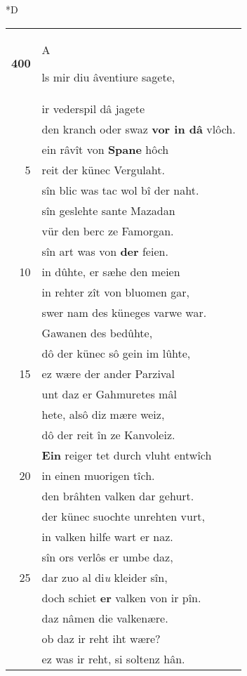 \documentclass[8pt,a4paper,notitlepage]{article}
\begin{document}
\begin{table}[ht]
\begin{minipage}[t]{0.5\linewidth}
\small
\begin{center}*D
\end{center}
\begin{tabular}{rl}
\textbf{400} & \begin{large}A\end{large}ls mir diu âventiure sagete,\\ 
 & ir vederspil dâ jagete\\ 
 & den kranch oder swaz \textbf{vor in dâ} vlôch.\\ 
 & ein râvît von \textbf{Spane} hôch\\ 
5 & reit der künec Vergulaht.\\ 
 & sîn blic was tac wol bî der naht.\\ 
 & sîn geslehte sante Mazadan\\ 
 & vür den berc ze Famorgan.\\ 
 & sîn art was von \textbf{der} feien.\\ 
10 & in dûhte, er sæhe den meien\\ 
 & in rehter zît von bluomen gar,\\ 
 & swer nam des küneges varwe war.\\ 
 & Gawanen des bedûhte,\\ 
 & dô der künec sô gein im lûhte,\\ 
15 & ez wære der ander Parzival\\ 
 & unt daz er Gahmuretes mâl\\ 
 & hete, alsô diz mære weiz,\\ 
 & dô der reit în ze Kanvoleiz.\\ 
 & \textbf{Ein} reiger tet durch vluht entwîch\\ 
20 & in einen muorigen tîch.\\ 
 & den brâhten valken dar gehurt.\\ 
 & der künec suochte unrehten vurt,\\ 
 & in valken hilfe wart er naz.\\ 
 & sîn ors verlôs er umbe daz,\\ 
25 & dar zuo al di\textit{u} kleider sîn,\\ 
 & doch schiet \textbf{er} valken von ir pîn.\\ 
 & daz nâmen die valkenære.\\ 
 & ob daz ir reht iht wære?\\ 
 & ez was ir reht, si soltenz hân.\\ 

\end{tabular}
\end{minipage}
\end{table}
\end{document}
